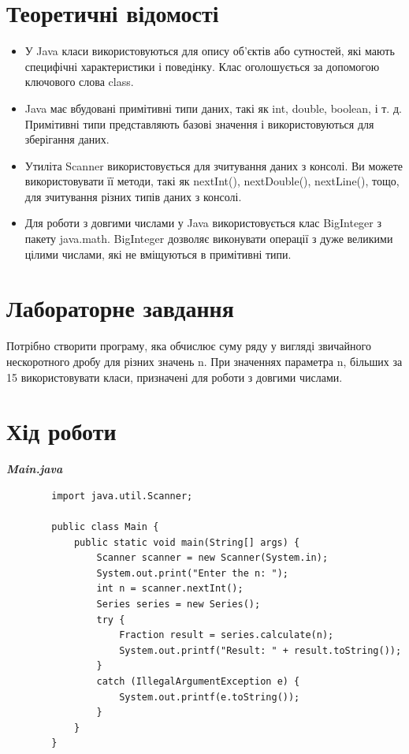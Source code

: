 \documentclass[14pt]{extreport}
\begin{document}
\begin{normalsize}
	\section*{Теоретичні відомості}
	\begin{itemize}
		\item У Java класи використовуються для опису об’єктів або сутностей, які мають специфічні характеристики і поведінку. Клас оголошується за допомогою ключового слова class.
		\item Java має вбудовані примітивні типи даних, такі як int, double, boolean, і т. д. Примітивні типи представляють базові значення і використовуються для зберігання даних.
		\item Утиліта Scanner використовується для зчитування даних з консолі. Ви можете використовувати її методи, такі як nextInt(), nextDouble(), nextLine(), тощо, для зчитування різних типів даних з консолі.
		\item Для роботи з довгими числами у Java використовується клас BigInteger з пакету java.math. BigInteger дозволяє виконувати операції з дуже великими цілими числами, які не вміщуються в примітивні типи.
	\end{itemize}

	\section*{Лабораторне завдання}
	Потрібно створити програму, яка обчислює суму ряду у вигляді звичайного нескоротного дробу для різних значень n. При значеннях параметра n, більших за 15 використовувати класи, призначені для роботи з довгими числами. 
	
	\section*{Хід роботи}

	\textbf{\textit{Main.java}}
	\begin{lstlisting}
		import java.util.Scanner;
		
		public class Main {
			public static void main(String[] args) {
				Scanner scanner = new Scanner(System.in);
				System.out.print("Enter the n: ");
				int n = scanner.nextInt();
				Series series = new Series();
				try {
					Fraction result = series.calculate(n);
					System.out.printf("Result: " + result.toString());
				}
				catch (IllegalArgumentException e) {
					System.out.printf(e.toString());
				}
			}
		}
	\end{lstlisting}
	

\end{normalsize}
\end{document}
